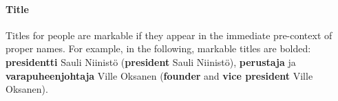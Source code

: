 \documentclass[11pt]{article}
\begin{document}
\paragraph{Title}

Titles for people are markable if they appear in the immediate pre-context of proper names. For example, in the following, markable titles are bolded: \textbf{presidentti} Sauli Niinist\"o (\textbf{president} Sauli Niinist\"o), \textbf{perustaja} ja \textbf{varapuheenjohtaja} Ville Oksanen (\textbf{founder} and \textbf{vice president} Ville Oksanen).   












 
\end{document}
